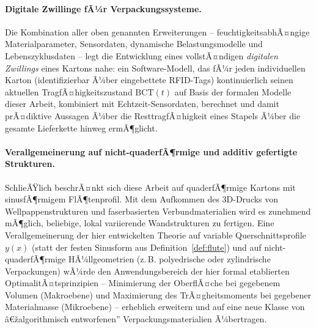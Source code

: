 ﻿\documentclass[a4paper,12pt]{article}
\theoremstyle{definition}
\begin{document}
\paragraph{Digitale Zwillinge fÃ¼r Verpackungssysteme.}
Die Kombination aller oben genannten Erweiterungen -- feuchtigkeitsabhÃ¤ngige
Materialparameter, Sensordaten, dynamische Belastungsmodelle und
Lebenszyklusdaten -- legt die Entwicklung eines vollstÃ¤ndigen \emph{digitalen
Zwillings} eines Kartons nahe: ein Software-Modell, das fÃ¼r jeden individuellen
Karton (identifizierbar Ã¼ber eingebettete RFID-Tags) kontinuierlich seinen
aktuellen TragfÃ¤higkeitszustand $\mathrm{BCT}(t)$ auf Basis der formalen Modelle
dieser Arbeit, kombiniert mit Echtzeit-Sensordaten, berechnet und damit
prÃ¤diktive Aussagen Ã¼ber die ResttragfÃ¤higkeit eines Stapels Ã¼ber die gesamte
Lieferkette hinweg ermÃ¶glicht.

\paragraph{Verallgemeinerung auf nicht-quaderfÃ¶rmige und additiv gefertigte Strukturen.}
SchlieÃŸlich beschrÃ¤nkt sich diese Arbeit auf quaderfÃ¶rmige Kartons mit
sinusfÃ¶rmigem FlÃ¶tenprofil. Mit dem Aufkommen des 3D-Drucks von
Wellpappenstrukturen und faserbasierten Verbundmaterialien wird es zunehmend
mÃ¶glich, beliebige, lokal variierende Wandstrukturen zu fertigen. Eine
Verallgemeinerung der hier entwickelten Theorie auf variable Querschnittsprofile
$y(x)$ (statt der festen Sinusform aus Definition~\ref{def:flute}) und auf
nicht-quaderfÃ¶rmige HÃ¼llgeometrien (z.\,B. polyedrische oder zylindrische
Verpackungen) wÃ¼rde den Anwendungsbereich der hier formal etablierten
OptimalitÃ¤tsprinzipien -- Minimierung der OberflÃ¤che bei gegebenem Volumen
(Makroebene) und Maximierung des TrÃ¤gheitsmoments bei gegebener Materialmasse
(Mikroebene) -- erheblich erweitern und auf eine neue Klasse von
â€žalgorithmisch entworfenen'' Verpackungsmaterialien Ã¼bertragen.
\end{document}

